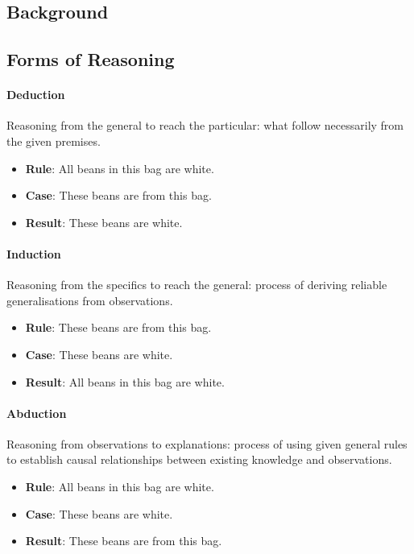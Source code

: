 \documentclass{article}
\theoremstyle{plain}
\theoremstyle{definition}
\begin{document}
\begin{multicols}{2}
\section{Background}
\subsection{Forms of Reasoning}

\paragraph{Deduction} Reasoning from the general to reach the particular: what follow necessarily from the given premises.

\begin{itemize}
\item \textbf{Rule}: All beans in this bag are white.
\item \textbf{Case}: These beans are from this bag.
\item \textbf{Result}: These beans are white.
\end{itemize}

\paragraph{Induction} Reasoning from the specifics to reach the general: process of deriving reliable generalisations from observations.

\begin{itemize}
\item \textbf{Rule}: These beans are from this bag.
\item \textbf{Case}: These beans are white.
\item \textbf{Result}: All beans in this bag are white.
\end{itemize}

\paragraph{Abduction} Reasoning from observations to explanations: process of using given general rules to establish causal relationships between existing knowledge and observations. 

\begin{itemize}
\item \textbf{Rule}: All beans in this bag are white.
\item \textbf{Case}: These beans are white.
\item \textbf{Result}: These beans are from this bag.
\end{itemize}


\end{multicols}
\end{document}
